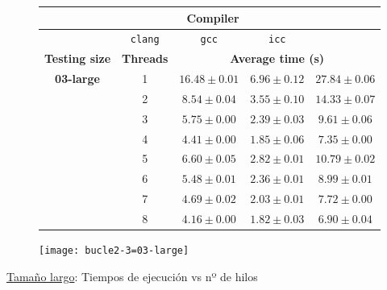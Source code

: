 \begin{figure}[H]
    \centering
    \begin{subfigure}{0.4\textwidth}
        \begin{adjustbox}{width=\textwidth} 
        \begin{tabular}{|c|c|c|c|c|}
            \hline
            \rowcolor{azul} \multicolumn{2}{|c|}{}&\multicolumn{3}{c|}{\textbf{Compiler}} \\ \hline
            \rowcolor{azul} \multicolumn{2}{|c|}{}&\texttt{clang}&\texttt{gcc}&\texttt{icc}\\ \hline
            \rowcolor{azul} \textbf{Testing size} & \textbf{Threads}&\multicolumn{3}{c|}{\textbf{Average time (s)}} \\ \hline
            \multirow{8}{1cm}{\textbf{03-large}} & 1 & \(16.48\pm{0.01}\) & \(6.96\pm{0.12}\) & \(27.84\pm{0.06}\) \\ \cline{2-5}
            & 2 & \(8.54\pm{0.04}\) & \(3.55\pm{0.10}\) & \(14.33\pm{0.07}\) \\ \cline{2-5}
            & 3 & \(5.75\pm{0.00}\) & \(2.39\pm{0.03}\) & \(9.61\pm{0.06}\) \\ \cline{2-5}
            & 4 & \(4.41\pm{0.00}\) & \(1.85\pm{0.06}\) & \(7.35\pm{0.00}\) \\ \cline{2-5}
            & 5 & \(6.60\pm{0.05}\) & \(2.82\pm{0.01}\) & \(10.79\pm{0.02}\) \\ \cline{2-5}
            & 6 & \(5.48\pm{0.01}\) & \(2.36\pm{0.01}\) & \(8.99\pm{0.01}\) \\ \cline{2-5}
            & 7 & \(4.69\pm{0.02}\) & \(2.03\pm{0.01}\) & \(7.72\pm{0.00}\) \\ \cline{2-5}
            & 8 & \(4.16\pm{0.00}\) & \(1.82\pm{0.03}\) & \(6.90\pm{0.04}\) \\ \hline
        \end{tabular}
        \end{adjustbox}
    \end{subfigure}
    \hfill
    \begin{subfigure}{0.5\textwidth}
        \texttt{[image: bucle2-3=03-large]}
    \end{subfigure}
    \caption{\underline{Tamaño largo}: Tiempos de ejecución vs nº de hilos}
    \label{bucle2-3=03-large}
\end{figure}

